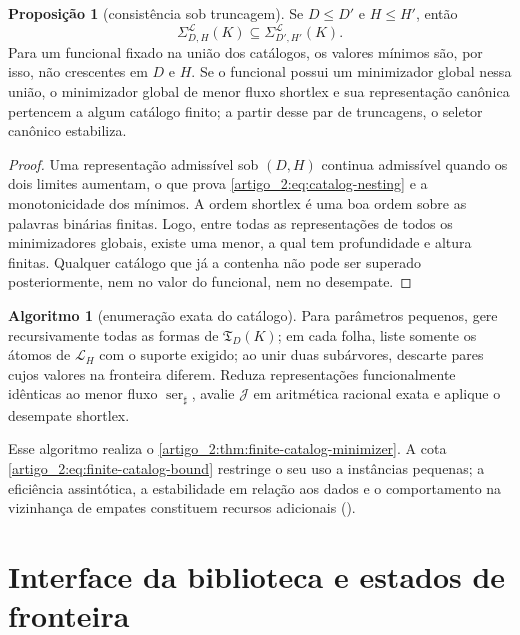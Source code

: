 \documentclass[12pt,a4paper]{article}
\makeatletter
\theoremstyle{preciso}
\theoremstyle{definition}
\newcommand{\Library}{\mathcal{L}}
\theoremstyle{preciso}
\theoremstyle{preciso}
\theoremstyle{preciso}
\newtheorem{proposition}[teorema]{Proposição}
\theoremstyle{preciso}
\theoremstyle{definition}
\theoremstyle{preciso}
\newtheorem{algorithm}[teorema]{Algoritmo}
\theoremstyle{definition}
\theoremstyle{preciso}
\theoremstyle{preciso}
\theoremstyle{definition}
\newcommand{\abntlookup}[2]{\ifcsname ab#1@#2\endcsname\csname ab#1@#2\endcsname\else\textbf{??}\PackageWarning{abnt}{Citacao indefinida: #2}\fi}
\newcommand{\abntpar}[1]{\hyperlink{bib:#1}{\abntlookup{U}{#1}, \abntlookup{Y}{#1}}}
\newcommand{\abntsep}{}
\newcommand{\abntpitem}[1]{\abntsep\renewcommand{\abntsep}{; }\abntpar{#1}}
\newcommand{\citep}[2][]{\begingroup\renewcommand{\abntsep}{}(\forcsvlist{\abntpitem}{#2}\ifblank{#1}{}{, #1})\endgroup}
\makeatother
\begin{document}
\begin{proposition}[consistência sob truncagem]\label{map:artigo_2:3.24}
\label{artigo_2:prop:catalog-consistency}
Se $D\le D'$ e $H\le H'$, então
\begin{equation}
 \Sigma_{D,H}^{\Library}(K)
 \subseteq\Sigma_{D',H'}^{\Library}(K).
 \label{artigo_2:eq:catalog-nesting}
\end{equation}
Para um funcional fixado na união dos catálogos, os valores mínimos são, por
isso, não crescentes em $D$ e $H$. Se o funcional possui um minimizador global
nessa união, o minimizador global de menor fluxo shortlex e sua representação
canônica pertencem a algum catálogo finito; a partir desse par de truncagens,
o seletor canônico estabiliza.
\end{proposition}

\begin{proof}
Uma representação admissível sob $(D,H)$ continua admissível quando os dois
limites aumentam, o que prova \eqref{artigo_2:eq:catalog-nesting} e a monotonicidade dos
mínimos. A ordem shortlex é uma boa ordem sobre as palavras binárias finitas. Logo, entre
todas as representações de todos os minimizadores globais, existe uma menor,
a qual tem profundidade e altura finitas. Qualquer catálogo que já a contenha não
pode ser superado posteriormente, nem no valor do funcional, nem no desempate.
\end{proof}

\begin{algorithm}[enumeração exata do catálogo]\label{map:artigo_2:3.25}\label{artigo_2:alg:finite-enumeration}
Para parâmetros pequenos, gere recursivamente todas as formas de
$\mathfrak T_D(K)$; em cada folha, liste somente os átomos de $\Library_H$ com
o suporte exigido; ao unir duas subárvores, descarte pares cujos valores na
fronteira diferem. Reduza representações funcionalmente idênticas ao menor
fluxo $\operatorname{ser}_\sharp$, avalie $\mathcal J$ em aritmética racional
exata e aplique o desempate shortlex.
\end{algorithm}

Esse algoritmo realiza o
\cref{artigo_2:thm:finite-catalog-minimizer}. A cota
\eqref{artigo_2:eq:finite-catalog-bound} restringe o seu uso a instâncias pequenas;
a eficiência assintótica, a estabilidade em relação aos dados e o comportamento
na vizinhança de empates constituem recursos adicionais \citep{artigo_1-christof2021}.

\section{Interface da biblioteca e estados de fronteira}
\label{artigo_2:sec:interface}
\end{document}

